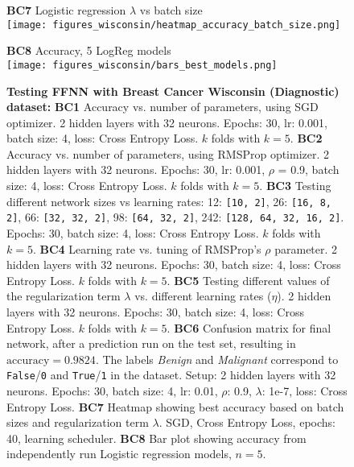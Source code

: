 \documentclass{article}
\begin{document}
\begin{figure}[htbp]
{\begin{minipage}{\textwidth}
            \begin{minipage}{0.66\textwidth}
            \centering
            \textbf{BC7} Logistic regression $\lambda$ vs batch size\label{fig:BC7} \\  %
            \texttt{[image: figures\_wisconsin/heatmap\_accuracy\_batch\_size.png]}
        \end{minipage}
            \begin{minipage}{0.325\textwidth}
            \centering
            \textbf{BC8} Accuracy, 5 LogReg models \label{fig:BC8} \\ %
            \texttt{[image: figures\_wisconsin/bars\_best\_models.png]}
        \end{minipage}
        \vspace{0.7em}
        \caption*{\textbf{Testing FFNN with Breast Cancer Wisconsin (Diagnostic) dataset: }\textbf{BC1} Accuracy vs. number of parameters, using SGD optimizer. 2 hidden layers with 32 neurons. Epochs: 30, lr: 0.001, batch size: 4, loss: Cross Entropy Loss. $k$ folds with $k = 5$. 
        \textbf{BC2} Accuracy vs. number of parameters, using RMSProp optimizer. 2 hidden layers with 32 neurons. Epochs: 30, lr: 0.001, $\rho$ = 0.9, batch size: 4, loss: Cross Entropy Loss. $k$ folds with $k = 5$. 
        \textbf{BC3} Testing different network sizes vs learning rates: 12: \texttt{[10, 2]}, 26: \texttt{[16, 8, 2]}, 66: \texttt{[32, 32, 2]}, 98: \texttt{[64, 32, 2]}, 242: \texttt{[128, 64, 32, 16, 2]}. Epochs: 30, batch size: 4, loss: Cross Entropy Loss. $k$ folds with $k = 5$.
        \textbf{BC4} Learning rate vs. tuning of RMSProp's $\rho$ parameter. 2 hidden layers with 32 neurons. Epochs: 30, batch size: 4, loss: Cross Entropy Loss. $k$ folds with $k = 5$. 
        \textbf{BC5} Testing different values of the regularization term $\lambda$ vs. different learning rates ($\eta$).  2 hidden layers with 32 neurons. Epochs: 30, batch size: 4, loss: Cross Entropy Loss. $k$ folds with $k = 5$.
        \textbf{BC6} Confusion matrix for final network, after a prediction run on the test set, resulting in $\text{accuracy}=0.9824$. The labels \textit{Benign} and \textit{Malignant} correspond to \texttt{False}/\texttt{0} and \texttt{True}/\texttt{1} in the dataset. Setup: 2 hidden layers with 32 neurons. Epochs: 30, batch size: 4, lr: 0.01, $\rho$: 0.9, $\lambda$: 1e-7, loss: Cross Entropy Loss.
        \textbf{BC7} Heatmap showing best accuracy based on batch sizes and regularization term $\lambda$. SGD, Cross Entropy Loss, epochs: 40, learning scheduler. \textbf{BC8} Bar plot showing accuracy from independently run Logistic regression models, $n=5$.}
        \label{fig:franke_figs}
    \end{minipage}
    }
\end{figure}
\restoregeometry
\end{document}
